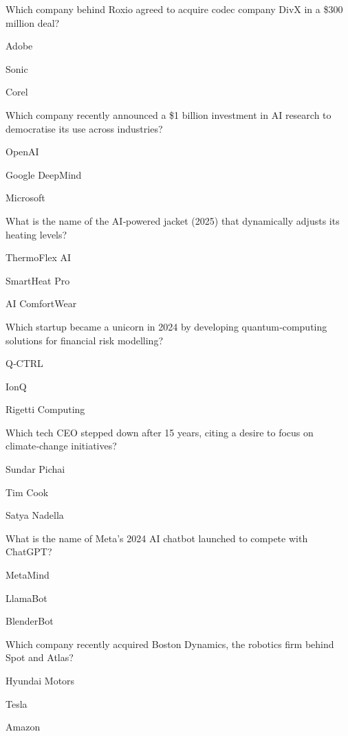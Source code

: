 \begin{enhancedmcq}{Which company behind Roxio agreed to acquire codec company DivX in a \$300 million deal?}
\item Adobe
\item Sonic
\item Corel

\end{enhancedmcq}
\begin{enhancedmcq}{Which company recently announced a \$1 billion investment in AI research to democratise its use across industries?}
\item OpenAI
\item Google DeepMind
\item Microsoft

\end{enhancedmcq}
\begin{enhancedmcq}{What is the name of the AI‑powered jacket (2025) that dynamically adjusts its heating levels?}
\item ThermoFlex AI
\item SmartHeat Pro
\item AI ComfortWear

\end{enhancedmcq}
\begin{enhancedmcq}{Which startup became a unicorn in 2024 by developing quantum‑computing solutions for financial risk modelling?}
\item Q‑CTRL
\item IonQ
\item Rigetti Computing

\end{enhancedmcq}
\begin{enhancedmcq}{Which tech CEO stepped down after 15 years, citing a desire to focus on climate‑change initiatives?}
\item Sundar Pichai
\item Tim Cook
\item Satya Nadella

\end{enhancedmcq}
\begin{enhancedmcq}{What is the name of Meta's 2024 AI chatbot launched to compete with ChatGPT?}
\item MetaMind
\item LlamaBot
\item BlenderBot

\end{enhancedmcq}
\begin{enhancedmcq}{Which company recently acquired Boston Dynamics, the robotics firm behind Spot and Atlas?}
\item Hyundai Motors
\item Tesla
\item Amazon

\end{enhancedmcq}

